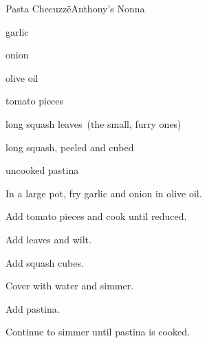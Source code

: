 \begin{recipe}{Pasta Checuzz\"e}{Anthony's Nonna}{}

\begin{ingredients}
\item garlic
\item onion
\item olive oil
\item tomato pieces
\item long squash leaves~(the small, furry ones)
\item long squash, peeled and cubed
\item uncooked pastina
\end{ingredients}

\begin{directions}
\item In a large pot, fry garlic and onion in olive oil.
\item Add tomato pieces and cook until reduced.
\item Add leaves and wilt.
\item Add squash cubes.
\item Cover with water and simmer.
\item Add pastina.
\item Continue to simmer until pastina is cooked.
\end{directions}

\end{recipe}
